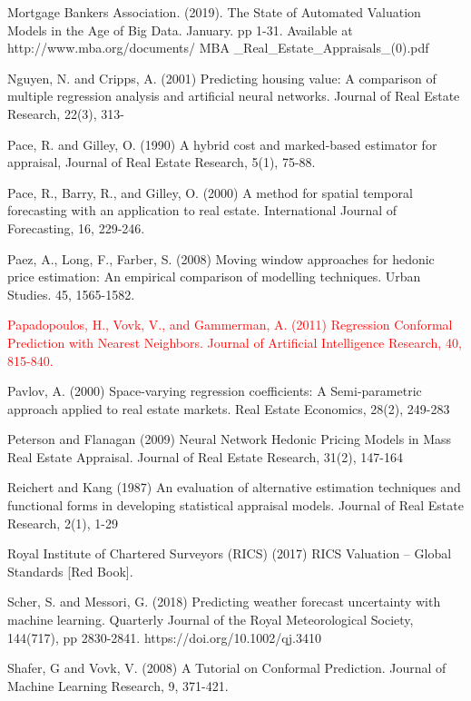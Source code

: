 \documentclass[colTwo]{anon}
\theoremstyle{definition}
\begin{document}
\begin{thebibliography}{50}
\harvarditem{}{}{}Mortgage Bankers Association. (2019). The State of Automated Valuation Models in the Age of Big Data. January. pp 1-31. Available at http://www.mba.org/documents/ MBA \_Real\_Estate\_Appraisals\_(0).pdf

\harvarditem{}{}{}Nguyen, N. and Cripps, A. (2001) Predicting housing value: A comparison of multiple regression analysis and artificial neural networks. Journal of Real Estate Research, 22(3), 313-

\harvarditem{}{}{}Pace, R. and Gilley, O. (1990) A hybrid cost and marked-based estimator for appraisal, Journal of Real Estate Research, 5(1), 75-88. 

\harvarditem{}{}{}Pace, R., Barry, R., and Gilley, O. (2000) A method for spatial temporal forecasting with an application to real estate.  International Journal of Forecasting, 16, 229-246. 

\harvarditem{}{}{}Paez, A., Long, F., Farber, S. (2008) Moving window approaches for hedonic price estimation: An empirical comparison of modelling techniques. Urban Studies. 45, 1565-1582. 

\textcolor{red}{\harvarditem{}{}{} Papadopoulos, H., Vovk, V., and Gammerman, A. (2011) Regression Conformal Prediction with Nearest Neighbors. Journal of Artificial Intelligence Research, 40, 815-840.} 

\harvarditem{}{}{}Pavlov, A. (2000) Space-varying regression coefficients: A Semi-parametric approach applied to real estate markets. Real Estate Economics, 28(2), 249-283

\harvarditem{}{}{}Peterson and Flanagan (2009) Neural Network Hedonic Pricing Models in Mass Real Estate Appraisal. Journal of Real Estate Research,  31(2), 147-164

\harvarditem{}{}{}Reichert and Kang (1987) An evaluation of alternative estimation techniques and functional forms in developing statistical appraisal models. Journal of Real Estate Research, 2(1), 1-29

\harvarditem{}{}{}Royal Institute of Chartered Surveyors (RICS) (2017) RICS Valuation – Global Standards [Red Book]. 

\harvarditem{}{}{}Scher, S. and Messori, G. (2018) Predicting weather forecast uncertainty with machine learning. Quarterly Journal of the Royal Meteorological Society, 144(717), pp 2830-2841.  https://doi.org/10.1002/qj.3410

\harvarditem{}{}{}Shafer, G and Vovk, V. (2008) A Tutorial on Conformal Prediction. Journal of Machine Learning Research, 9, 371-421. 


\end{thebibliography}
\end{document}
